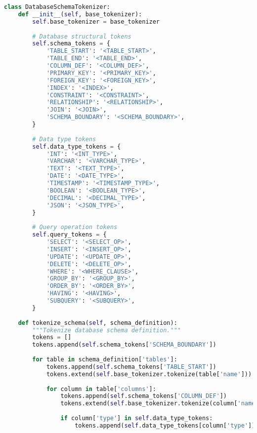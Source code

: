 \begin{lstlisting}[language=Python, caption=Schema-aware database tokenization system]
class DatabaseSchemaTokenizer:
    def __init__(self, base_tokenizer):
        self.base_tokenizer = base_tokenizer
        
        # Database structural tokens
        self.schema_tokens = {
            'TABLE_START': '<TABLE_START>',
            'TABLE_END': '<TABLE_END>',
            'COLUMN_DEF': '<COLUMN_DEF>',
            'PRIMARY_KEY': '<PRIMARY_KEY>',
            'FOREIGN_KEY': '<FOREIGN_KEY>',
            'INDEX': '<INDEX>',
            'CONSTRAINT': '<CONSTRAINT>',
            'RELATIONSHIP': '<RELATIONSHIP>',
            'JOIN': '<JOIN>',
            'SCHEMA_BOUNDARY': '<SCHEMA_BOUNDARY>',
        }
        
        # Data type tokens
        self.data_type_tokens = {
            'INT': '<INT_TYPE>',
            'VARCHAR': '<VARCHAR_TYPE>',
            'TEXT': '<TEXT_TYPE>',
            'DATE': '<DATE_TYPE>',
            'TIMESTAMP': '<TIMESTAMP_TYPE>',
            'BOOLEAN': '<BOOLEAN_TYPE>',
            'DECIMAL': '<DECIMAL_TYPE>',
            'JSON': '<JSON_TYPE>',
        }
        
        # Query operation tokens
        self.query_tokens = {
            'SELECT': '<SELECT_OP>',
            'INSERT': '<INSERT_OP>',
            'UPDATE': '<UPDATE_OP>',
            'DELETE': '<DELETE_OP>',
            'WHERE': '<WHERE_CLAUSE>',
            'GROUP_BY': '<GROUP_BY>',
            'ORDER_BY': '<ORDER_BY>',
            'HAVING': '<HAVING>',
            'SUBQUERY': '<SUBQUERY>',
        }
    
    def tokenize_schema(self, schema_definition):
        """Tokenize database schema definition."""
        tokens = []
        tokens.append(self.schema_tokens['SCHEMA_BOUNDARY'])
        
        for table in schema_definition['tables']:
            tokens.append(self.schema_tokens['TABLE_START'])
            tokens.extend(self.base_tokenizer.tokenize(table['name']))
            
            for column in table['columns']:
                tokens.append(self.schema_tokens['COLUMN_DEF'])
                tokens.extend(self.base_tokenizer.tokenize(column['name']))
                
                if column['type'] in self.data_type_tokens:
                    tokens.append(self.data_type_tokens[column['type']])
                

\end{lstlisting}
